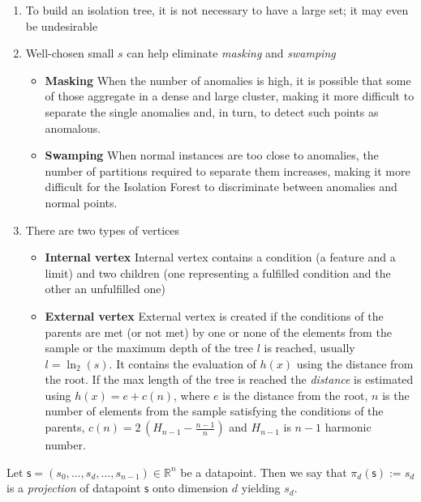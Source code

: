 \begin{enumerate}
    \item To build an isolation tree, it is not necessary to have a large set; it
  may even be undesirable
  \item Well-chosen small \(s\) can help eliminate \emph{masking} and
  \emph{swamping}


\begin{itemize}
    \item \textbf{Masking} When the number of anomalies is high, it is possible that some of those aggregate in a dense and large cluster, making it more difficult to separate the single anomalies and, in turn, to detect such points as
  anomalous.
    \item \textbf{Swamping} When normal instances are too close to anomalies, the number of
  partitions required to separate them increases, making it more difficult for the Isolation Forest to discriminate between
  anomalies and normal points.
\end{itemize}

\item There are two types of vertices

\begin{itemize}
    \item \textbf{Internal vertex} Internal vertex contains a condition (a feature and a limit) and two children (one
  representing a fulfilled condition and the other an unfulfilled one)
    \item \textbf{External vertex} External vertex is created if the conditions of the parents are met (or not met) by
  one or none of the elements from the sample or the maximum depth of
  the tree \(l\) is reached, usually \(l=\ln_2(s)\). It contains the
  evaluation of \(h(x)\) using the distance from the root. If the max
  length of the tree is reached the \emph{distance} is estimated using
  \(h(x)=e+c(n)\), where \(e\) is the distance from the root, \(n\) is
  the number of elements from the sample satisfying the conditions of
  the parents, \(c(n)=2\,(H_{n-1}-\frac{n-1}{n})\) and \(H_{n-1}\) is
  \(n-1\) harmonic number.
\end{itemize}

\end{enumerate}

\begin{definition}
Let $\mathsf{s}=(s_0, \dots, s_d, \dots, s_{n-1})\in \mathbb{R}^n$ be a datapoint. Then we say that $\pi_d(\mathsf{s}):=s_d$ is a \emph{projection} of datapoint $\mathsf{s}$ onto dimension $d$  yielding $s_d$.
\end{definition}

